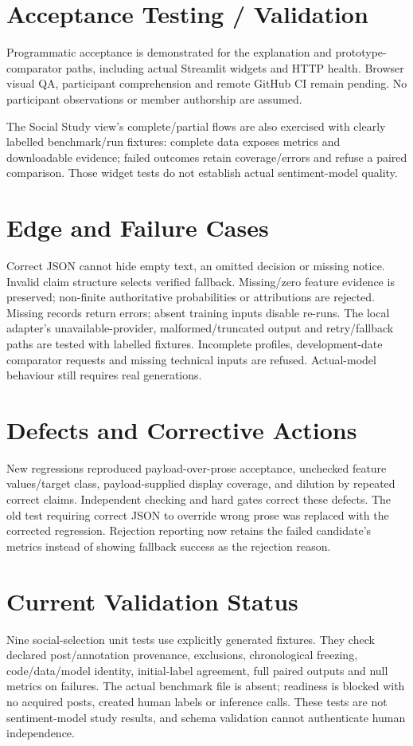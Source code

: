 \section{Acceptance Testing / Validation}
Programmatic acceptance is demonstrated for the explanation and prototype-comparator paths, including actual Streamlit widgets and HTTP health. Browser visual QA, participant comprehension and remote GitHub CI remain pending. No participant observations or member authorship are assumed.

The Social Study view's complete/partial flows are also exercised with clearly labelled benchmark/run fixtures: complete data exposes metrics and downloadable evidence; failed outcomes retain coverage/errors and refuse a paired comparison. Those widget tests do not establish actual sentiment-model quality.
\section{Edge and Failure Cases}
Correct JSON cannot hide empty text, an omitted decision or missing notice. Invalid claim structure selects verified fallback. Missing/zero feature evidence is preserved; non-finite authoritative probabilities or attributions are rejected. Missing records return errors; absent training inputs disable re-runs. The local adapter's unavailable-provider, malformed/truncated output and retry/fallback paths are tested with labelled fixtures. Incomplete profiles, development-date comparator requests and missing technical inputs are refused. Actual-model behaviour still requires real generations.
\section{Defects and Corrective Actions}
New regressions reproduced payload-over-prose acceptance, unchecked feature values/target class, payload-supplied display coverage, and dilution by repeated correct claims. Independent checking and hard gates correct these defects. The old test requiring correct JSON to override wrong prose was replaced with the corrected regression. Rejection reporting now retains the failed candidate's metrics instead of showing fallback success as the rejection reason.
\section{Current Validation Status}
Nine social-selection unit tests use explicitly generated fixtures. They check declared post/annotation provenance, exclusions, chronological freezing, code/data/model identity, initial-label agreement, full paired outputs and null metrics on failures. The actual benchmark file is absent; readiness is blocked with no acquired posts, created human labels or inference calls. These tests are not sentiment-model study results, and schema validation cannot authenticate human independence.

